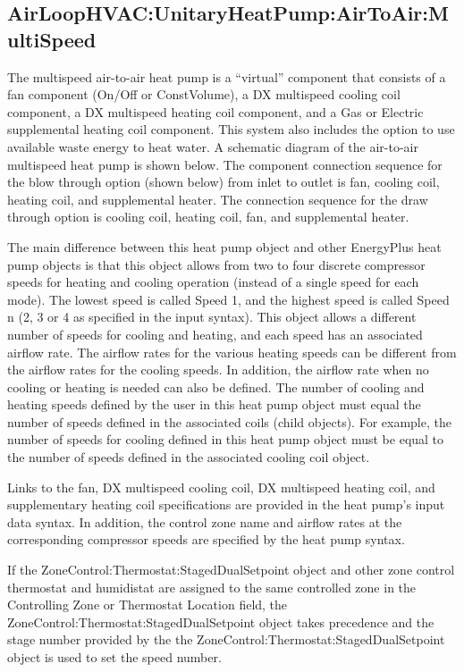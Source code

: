 \subsection{AirLoopHVAC:UnitaryHeatPump:AirToAir:MultiSpeed}\label{airloophvacunitaryheatpumpairtoairmultispeed}

The multispeed air-to-air heat pump is a ``virtual'' component that consists of a fan component (On/Off or ConstVolume), a DX multispeed cooling coil component, a DX multispeed heating coil component, and a Gas or Electric supplemental heating coil component. This system also includes the option to use available waste energy to heat water. A schematic diagram of the air-to-air multispeed heat pump is shown below. The component connection sequence for the blow through option (shown below) from inlet to outlet is fan, cooling coil, heating coil, and supplemental heater. The connection sequence for the draw through option is cooling coil, heating coil, fan, and supplemental heater.

The main difference between this heat pump object and other EnergyPlus heat pump objects is that this object allows from two to four discrete compressor speeds for heating and cooling operation (instead of a single speed for each mode). The lowest speed is called Speed 1, and the highest speed is called Speed n (2, 3 or 4 as specified in the input syntax). This object allows a different number of speeds for cooling and heating, and each speed has an associated airflow rate. The airflow rates for the various heating speeds can be different from the airflow rates for the cooling speeds. In addition, the airflow rate when no cooling or heating is needed can also be defined. The number of cooling and heating speeds defined by the user in this heat pump object must equal the number of speeds defined in the associated coils (child objects). For example, the number of speeds for cooling defined in this heat pump object must be equal to the number of speeds defined in the associated cooling coil object.

Links to the fan, DX multispeed cooling coil, DX multispeed heating coil, and supplementary heating coil specifications are provided in the heat pump's input data syntax. In addition, the control zone name and airflow rates at the corresponding compressor speeds are specified by the heat pump syntax.

If the ZoneControl:Thermostat:StagedDualSetpoint object and other zone control thermostat and humidistat are assigned to the same controlled zone in the Controlling Zone or Thermostat Location field, the ZoneControl:Thermostat:StagedDualSetpoint object takes precedence and the stage number provided by the the ZoneControl:Thermostat:StagedDualSetpoint object is used to set the speed number.

